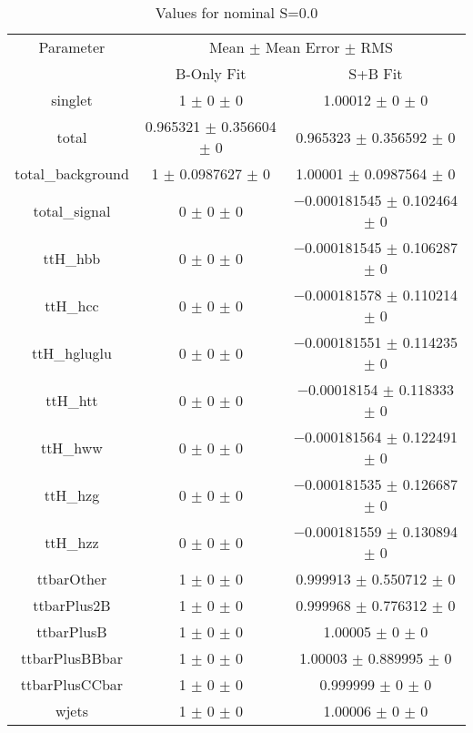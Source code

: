 \begin{table}
\centering
\caption{Values for nominal S=0.0}
\begin{tabular}{ccc}
\toprule
Parameter & \multicolumn{2}{c}{Mean $\pm$ Mean Error $\pm$ RMS}\\
 & B-Only Fit & S+B Fit\\
\midrule
singlet & \num{1} $\pm$ \num{0} $\pm$ \num{0} & \num{1.00012} $\pm$ \num{0} $\pm$ \num{0}\\
total & \num{0.965321} $\pm$ \num{0.356604} $\pm$ \num{0} & \num{0.965323} $\pm$ \num{0.356592} $\pm$ \num{0}\\
total\_background & \num{1} $\pm$ \num{0.0987627} $\pm$ \num{0} & \num{1.00001} $\pm$ \num{0.0987564} $\pm$ \num{0}\\
total\_signal & \num{0} $\pm$ \num{0} $\pm$ \num{0} & \num{-0.000181545} $\pm$ \num{0.102464} $\pm$ \num{0}\\
ttH\_hbb & \num{0} $\pm$ \num{0} $\pm$ \num{0} & \num{-0.000181545} $\pm$ \num{0.106287} $\pm$ \num{0}\\
ttH\_hcc & \num{0} $\pm$ \num{0} $\pm$ \num{0} & \num{-0.000181578} $\pm$ \num{0.110214} $\pm$ \num{0}\\
ttH\_hgluglu & \num{0} $\pm$ \num{0} $\pm$ \num{0} & \num{-0.000181551} $\pm$ \num{0.114235} $\pm$ \num{0}\\
ttH\_htt & \num{0} $\pm$ \num{0} $\pm$ \num{0} & \num{-0.00018154} $\pm$ \num{0.118333} $\pm$ \num{0}\\
ttH\_hww & \num{0} $\pm$ \num{0} $\pm$ \num{0} & \num{-0.000181564} $\pm$ \num{0.122491} $\pm$ \num{0}\\
ttH\_hzg & \num{0} $\pm$ \num{0} $\pm$ \num{0} & \num{-0.000181535} $\pm$ \num{0.126687} $\pm$ \num{0}\\
ttH\_hzz & \num{0} $\pm$ \num{0} $\pm$ \num{0} & \num{-0.000181559} $\pm$ \num{0.130894} $\pm$ \num{0}\\
ttbarOther & \num{1} $\pm$ \num{0} $\pm$ \num{0} & \num{0.999913} $\pm$ \num{0.550712} $\pm$ \num{0}\\
ttbarPlus2B & \num{1} $\pm$ \num{0} $\pm$ \num{0} & \num{0.999968} $\pm$ \num{0.776312} $\pm$ \num{0}\\
ttbarPlusB & \num{1} $\pm$ \num{0} $\pm$ \num{0} & \num{1.00005} $\pm$ \num{0} $\pm$ \num{0}\\
ttbarPlusBBbar & \num{1} $\pm$ \num{0} $\pm$ \num{0} & \num{1.00003} $\pm$ \num{0.889995} $\pm$ \num{0}\\
ttbarPlusCCbar & \num{1} $\pm$ \num{0} $\pm$ \num{0} & \num{0.999999} $\pm$ \num{0} $\pm$ \num{0}\\
wjets & \num{1} $\pm$ \num{0} $\pm$ \num{0} & \num{1.00006} $\pm$ \num{0} $\pm$ \num{0}\\
\bottomrule
\end{tabular}
\end{table}